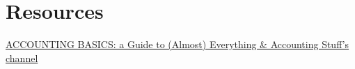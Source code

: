 \documentclass{article}
\begin{document}



\newpage
\tableofcontents
\newpage









\section{Resources}
\href{https://youtu.be/yYX4bvQSqbo?si=JNw8xPh7I50bIBxX}{ACCOUNTING BASICS: a Guide to (Almost) Everything \& Accounting Stuff's channel}
\end{document}
